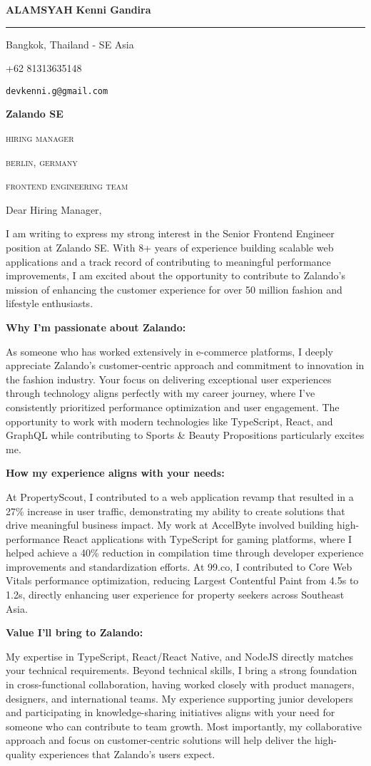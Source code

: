\documentclass[12pt]{article}
\newcommand{\mainColor}{redBlood} %
\newlength{\spacebox}
\newcommand{\shspace}{\hspace*{0.8em}}
\newcommand{\xvspace}{\vspace*{0.1em}}
\newcommand{\svspace}{\vspace*{0.5em}}
\newcommand{\mvspace}{\vspace*{1.5em}}
\newcommand{\hvspace}{\vspace*{2.5em}}
\newcommand{\negmvspace}{\vspace*{-1em}}
\newcommand{\userInfo}[4]{
    \begin{flushleft}
        \color{\mainColor}
        \Huge
        \textbf{\MakeUppercase{ALAMSYAH}}
        \color{black}
        \textbf{Kenni Gandira}
        \color{\mainColor}
        \noindent\rule{19.1cm}{0.8pt}
        \color{grayShy}
        \small
        \par
        \parbox{7\spacebox} {
            \faMap \shspace #1 - #2 \par \svspace
            \faPhone \shspace #3 \par \svspace
            \faEnvelopeOpen \shspace \texttt{#4} \par \svspace
        }
        \color{\mainColor}
        \mvspace
    \end{flushleft}
    \negmvspace
}
\newcommand{\companyInfo}[4]{
    \begin{flushright}
        \parbox{4\spacebox}{
            \raggedleft
            \small
            \textbf{#1}\par
            \mvspace
            \color{grayShy} \textsc{\MakeLowercase{#2}}\par
            \xvspace
            \textsc{\MakeLowercase{#3}}\par
            \xvspace
            \textsc{\MakeLowercase{#4}}\par
            \color{black}
        }
    \end{flushright}
}
\begin{document}
\userInfo{Bangkok, Thailand}{SE Asia}{+62 81313635148}{devkenni.g@gmail.com}

\companyInfo{Zalando SE}{Hiring Manager}{Berlin, Germany}{Frontend Engineering Team}

\hvspace

Dear Hiring Manager,

I am writing to express my strong interest in the Senior Frontend Engineer position at Zalando SE. With 8+ years of experience building scalable web applications and a track record of contributing to meaningful performance improvements, I am excited about the opportunity to contribute to Zalando's mission of enhancing the customer experience for over 50 million fashion and lifestyle enthusiasts.

\textbf{Why I'm passionate about Zalando:}

As someone who has worked extensively in e-commerce platforms, I deeply appreciate Zalando's customer-centric approach and commitment to innovation in the fashion industry. Your focus on delivering exceptional user experiences through technology aligns perfectly with my career journey, where I've consistently prioritized performance optimization and user engagement. The opportunity to work with modern technologies like TypeScript, React, and GraphQL while contributing to Sports \& Beauty Propositions particularly excites me.

\textbf{How my experience aligns with your needs:}

At PropertyScout, I contributed to a web application revamp that resulted in a 27\% increase in user traffic, demonstrating my ability to create solutions that drive meaningful business impact. My work at AccelByte involved building high-performance React applications with TypeScript for gaming platforms, where I helped achieve a 40\% reduction in compilation time through developer experience improvements and standardization efforts. At 99.co, I contributed to Core Web Vitals performance optimization, reducing Largest Contentful Paint from 4.5s to 1.2s, directly enhancing user experience for property seekers across Southeast Asia.

\textbf{Value I'll bring to Zalando:}

My expertise in TypeScript, React/React Native, and NodeJS directly matches your technical requirements. Beyond technical skills, I bring a strong foundation in cross-functional collaboration, having worked closely with product managers, designers, and international teams. My experience supporting junior developers and participating in knowledge-sharing initiatives aligns with your need for someone who can contribute to team growth. Most importantly, my collaborative approach and focus on customer-centric solutions will help deliver the high-quality experiences that Zalando's users expect.
\end{document}
